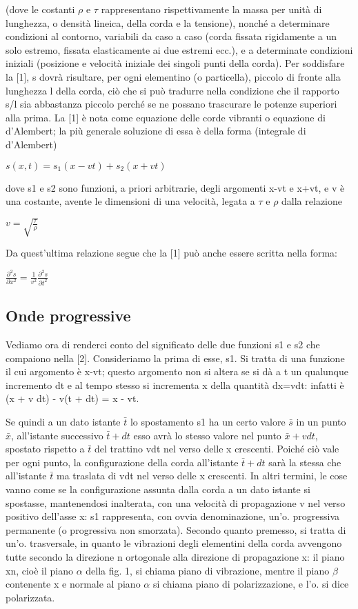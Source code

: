\documentclass[a4paper]{article}
\begin{document}
(dove le costanti $\rho$ e $\tau$ rappresentano rispettivamente la massa per unità di lunghezza, o densità lineica, della corda e la tensione), nonché a determinare condizioni al contorno, variabili da caso a caso (corda fissata rigidamente a un solo estremo, fissata elasticamente ai due estremi ecc.), e a determinate condizioni iniziali (posizione e velocità iniziale dei singoli punti della corda). Per soddisfare la [1], s dovrà risultare, per ogni elementino (o particella), piccolo di fronte alla lunghezza l della corda, ciò che si può tradurre nella condizione che il rapporto s/l sia abbastanza piccolo perché se ne possano trascurare le potenze superiori alla prima. La [1] è nota come equazione delle corde vibranti o equazione di d'Alembert; la più generale soluzione di essa è della forma (integrale di d'Alembert) 

$s(x,t)=s_1(x-vt)+s_2(x+vt)$

dove s1 e s2 sono funzioni, a priori arbitrarie, degli argomenti x-vt e x+vt, e v è una costante, avente le dimensioni di una velocità, legata a $\tau$ e $\rho$ dalla relazione 

$v=\sqrt{\frac{\tau}{\rho}}$

Da quest'ultima relazione segue che la [1] può anche essere scritta nella forma: 

$\frac{\partial^2 s}{\partial x^2}=\frac{1}{v^2}\frac{\partial^2 s}{\partial t^2}$

\subsection{Onde progressive}
Vediamo ora di renderci conto del significato delle due funzioni s1 e s2 che compaiono nella [2]. Consideriamo la prima di esse, s1. Si tratta di una funzione il cui argomento è x-vt; questo argomento non si altera se si dà a t un qualunque incremento dt e al tempo stesso si incrementa x della quantità dx=vdt: infatti è (x + v dt) - v(t + dt) = x - vt.

Se quindi a un dato istante $\bar{t}$ lo spostamento s1 ha un certo valore $\bar{s}$ in un punto $\bar{x}$, all'istante successivo $\bar{t}+dt$ esso avrà lo stesso valore nel punto $\bar{x}+vdt$, spostato rispetto a $\bar{t}$ del trattino vdt nel verso delle x crescenti. Poiché ciò vale per ogni punto, la configurazione della corda all'istante $\bar{t}+dt$ sarà la stessa che all'istante $\bar{t}$ ma traslata di vdt nel verso delle x crescenti. In altri termini, le cose vanno come se la configurazione assunta dalla corda a un dato istante si spostasse, mantenendosi inalterata, con una velocità di propagazione v nel verso positivo dell'asse x: s1 rappresenta, con ovvia denominazione, un'o. progressiva permanente (o progressiva non smorzata). Secondo quanto premesso, si tratta di un'o. trasversale, in quanto le vibrazioni degli elementini della corda avvengono tutte secondo la direzione n ortogonale alla direzione di propagazione x: il piano xn, cioè il piano $\alpha$ della fig. 1, si chiama piano di vibrazione, mentre il piano $\beta$ contenente x e normale al piano $\alpha$ si chiama piano di polarizzazione, e l'o. si dice polarizzata. 
\end{document}
